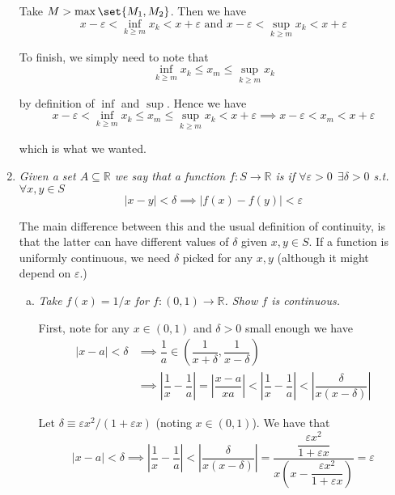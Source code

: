 \documentclass{article}
\begin{document}
\begin{enumerate}[1.]
    Take $M > \max\set{M_1, M_2}$. Then we have
    \[
      x - \varepsilon < \inf_{k \ge m} x_k < x + \varepsilon
      \text{ and }
      x - \varepsilon < \sup_{k \ge m} x_k < x + \varepsilon
    \]

    To finish, we simply need to note that
    \[
      \inf_{k \ge m} x_k \le x_m \le \sup_{k \ge m} x_k
    \]

    by definition of $\inf$ and $\sup$. Hence we have
    \[
      x - \varepsilon < \inf_{k \ge m} x_k \le x_m \le \sup_{k \ge m} x_k < x + \varepsilon
      \implies
      x - \varepsilon < x_m < x + \varepsilon
    \]

    which is what we wanted.

  \item {\itshape
    Given a set $A \subseteq \mathbb{R}$ we say that a function $f: S \to \mathbb{R}$ is  if $\forall \varepsilon > 0 ~~ \exists \delta > 0$ s.t. $\forall x, y \in S$
    \[
      |x - y| < \delta \implies |f(x) - f(y)| < \varepsilon
    \]

    The main difference between this and the usual definition of continuity, is that the latter can have different values of $\delta$ given $x, y \in S$. If a function is uniformly continuous, we need $\delta$ picked for any $x, y$ (although it might depend on $\varepsilon$.)}
    \begin{enumerate}[a)]
      \item \textit{Take $f(x) = 1 / x$ for $f: (0, 1) \to \mathbb{R}$. Show $f$ is continuous.}

        \solution First, note for any $x \in (0, 1)$ and $\delta > 0$ small enough we have
        \begin{align*}
            |x - a| < \delta
            &
            \implies
            \dfrac{1}{a}
            \in
            \left(
              \dfrac{1}{x + \delta},
              \dfrac{1}{x - \delta}
            \right)
            \\
            &
            \implies
            \left|\dfrac{1}{x} - \dfrac{1}{a}\right|
            =
            \left|\dfrac{x - a}{xa}\right|
            <
            \left|\dfrac{1}{x} - \dfrac{1}{a}\right|
            <
            \left|\dfrac{\delta}{x (x - \delta)}\right|
        \end{align*}

        Let $\delta \equiv \varepsilon x^2 / (1 + \varepsilon x)$ (noting $x \in (0, 1)$). We have that
        \[
            |x - a| < \delta
            \implies
            \left|\dfrac{1}{x} - \dfrac{1}{a}\right|
            <
            \left|\dfrac{\delta}{x (x - \delta)}\right|
            =
            \dfrac{\dfrac{\varepsilon x^2}{1 + \varepsilon x}}{x \left(x - \dfrac{\varepsilon x^2}{1 + \varepsilon x}\right)}
            =
            \varepsilon
        \]


\end{enumerate}
\end{enumerate}
\end{document}
